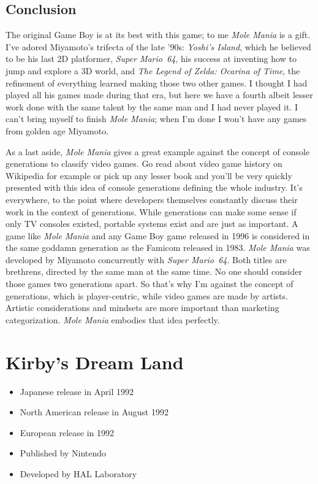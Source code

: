 \documentclass{book}
\begin{document}
\FloatBarrier\needspace{10mm}\section*{Conclusion}\nopagebreak[4]
The original Game Boy is at its best with this game; to me \emph{Mole Mania} is a gift. I’ve adored Miyamoto’s trifecta of the late ’90s: \emph{Yoshi’s Island}, which he believed to be his last 2D platformer, \emph{Super Mario 64}, his success at inventing how to jump and explore a 3D world, and \emph{The Legend of Zelda: Ocarina of Time}, the refinement of everything learned making those two other games. I thought I had played all his games made during that era, but here we have a fourth albeit lesser work done with the same talent by the same man and I had never played it. I can’t bring myself to finish \emph{Mole Mania}; when I’m done I won’t have any games from golden age Miyamoto.

As a last aside, \emph{Mole Mania} gives a great example against the concept of console generations to classify video games. Go read about video game history on Wikipedia for example or pick up any lesser book and you’ll be very quickly presented with this idea of console generations defining the whole industry. It’s everywhere, to the point where developers themselves constantly discuss their work in the context of generations. While generations can make some sense if only TV consoles existed, portable systems exist and are just as important. A game like \emph{Mole Mania} and any Game Boy game released in 1996 is considered in the same goddamn generation as the Famicom released in 1983. \emph{Mole Mania} was developed by Miyamoto concurrently with \emph{Super Mario 64}. Both titles are brethrens, directed by the same man at the same time. No one should consider those games two generations apart. So that’s why I’m against the concept of generations, which is player-centric, while video games are made by artists. Artistic considerations and mindsets are more important than marketing categorization. \emph{Mole Mania} embodies that idea perfectly.


\begingroup \chapter*{Kirby’s Dream Land} \endgroup

\begin{itemize} \setlength\itemsep{-0.4em}
\item Japanese release in April 1992
\item North American release in August 1992
\item European release in 1992
\item Published by Nintendo
\item Developed by HAL Laboratory
\end{itemize}\noindent
\end{document}
